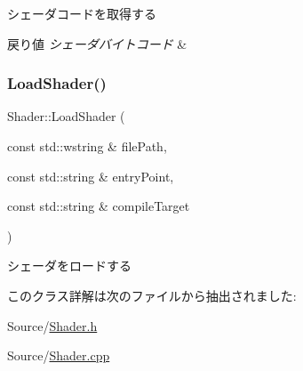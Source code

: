 シェーダコードを取得する 
\begin{DoxyRetVals}{戻り値}
{\em シェーダバイトコード} & \\
\hline
\end{DoxyRetVals}
\mbox{\label{class_shader_ae290b5ecab7217ee98491263adab5247}} 
\subsubsection{\texorpdfstring{Load\+Shader()}{LoadShader()}}
{\footnotesize\ttfamily Shader\+::\+Load\+Shader (\begin{DoxyParamCaption}\item[{const std\+::wstring \&}]{file\+Path,  }\item[{const std\+::string \&}]{entry\+Point,  }\item[{const std\+::string \&}]{compile\+Target }\end{DoxyParamCaption})}

シェーダをロードする 

このクラス詳解は次のファイルから抽出されました\+:\begin{DoxyCompactItemize}
\item 
Source/\mbox{\hyperlink{_shader_8h}{Shader.\+h}}\item 
Source/\mbox{\hyperlink{_shader_8cpp}{Shader.\+cpp}}\end{DoxyCompactItemize}

